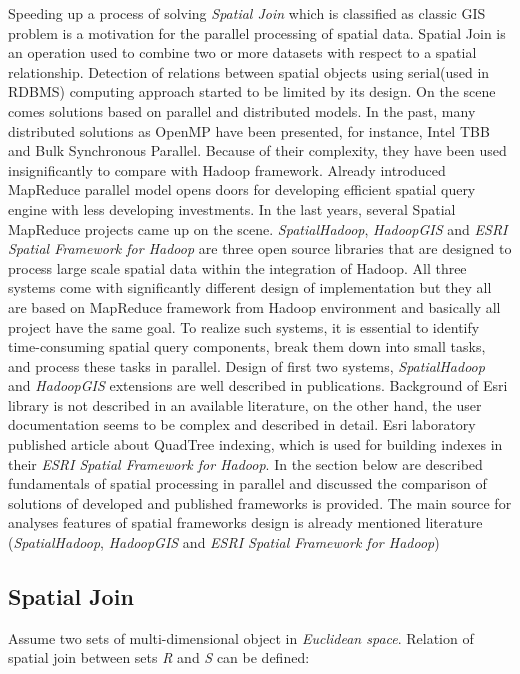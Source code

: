 \documentclass[a4paper,12pt,oneside]{report}
\begin{document}
Speeding up a process of solving \textit{Spatial Join} which is classified as classic GIS 
problem is a motivation for the parallel processing of spatial data. Spatial Join 
is an operation used to combine two or more datasets with respect to a spatial 
relationship. Detection of relations between spatial objects using serial(used in RDBMS) 
computing approach started to be limited by its design. On the scene comes solutions
based on parallel and distributed models. In the past, many distributed 
solutions as OpenMP\cite{omp} have been presented, for instance, Intel TBB and Bulk Synchronous Parallel\cite{multi_cpu}.
Because of their complexity, they have been used insignificantly to compare with Hadoop framework.
Already introduced MapReduce parallel model opens doors for developing efficient
spatial query engine with less developing investments. In the last years, several Spatial MapReduce projects came up on the scene.
\textit{SpatialHadoop}\cite{spatialhadoop}, \textit{HadoopGIS}\cite{hadoopGIS} and \textit{ESRI Spatial Framework for Hadoop}\cite{esri_framework}
are three open source libraries that are designed to process large scale spatial data within the integration of Hadoop.
All three systems come with significantly different design of implementation but they all are based
on MapReduce framework from Hadoop environment and basically all project have the same goal.
To realize such systems, it is essential to identify time-consuming spatial query components,
break them down into small tasks, and process these tasks in parallel. 
Design of first two systems, \textit{SpatialHadoop} and \textit{HadoopGIS}
extensions are well described in publications. Background of Esri library is not described in an available
literature, on the other hand, the user documentation seems to be complex and described in detail. 
Esri laboratory published article\cite{esri_indexing} about QuadTree indexing, which is used for building 
indexes in their \textit{ESRI Spatial Framework for Hadoop}.
In the section below are described fundamentals of spatial processing in parallel and  discussed 
the comparison of solutions of developed and published frameworks is provided. The main source for  analyses features of spatial frameworks design is already mentioned literature (\textit{SpatialHadoop}\cite{spatialhadoop}, \textit{HadoopGIS}\cite{hadoopGIS} 
and \textit{ESRI Spatial Framework for Hadoop}\cite{esri_framework})

		
\subsection{Spatial Join}
\label{sub:spatial_join}
Assume two sets of multi-dimensional object in \emph{Euclidean space}. Relation of spatial 
join between sets \emph{R} and \emph{S} can be defined\cite{spatial_join2}:
\end{document}
